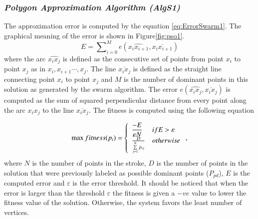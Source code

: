 \documentclass[preprint,10pt,5p,twocolumn]{elsarticle}
\begin{document}
\subsubsection{\textit{Polygon Approximation Algorithm \textsl{(AlgS1)}}}
The approximation error is computed by the equation \ref{eq:ErrorSwarm1}. The graphical meaning of the error is shown in Figure\ref{fig:pso1}.
\begin{equation}
E=\sum\nolimits_{i = 0}^M e ( \widehat{x_ix_{i+1}},\overline{x_i x_{i+1}})
\label{eq:ErrorSwarm1}
\end{equation} where the arc $\widehat{x_ix_j}$ is defined as the consecutive set of points from point $x_i$ to point $x_{j}$ as in $x_i,x_{i+1} \cdots,x_j$. The line $\overline{x_i x_j}$ is defined as the straight line connecting point $x_i$ to point $x_j$ and $M$ is the number of dominant points in this solution as generated by the swarm algorithm. The error $e ( \widehat{x_ix_j},\overline{x_i x_j})$ is computed as the sum of squared perpendicular distance from every point along the arc $\widehat{x_ix_j}$ to the line $\overline{x_i x_j}$. The fitness is computed using the following equation %

\begin{equation}
\max fitness(p_i ) = \left\{ {\begin{array}{*{30}l}
   {\displaystyle \frac{-E}{\varepsilon N}} & {ifE > \varepsilon }  \\ 
   
   { \frac {D}{\sum\limits_{j = 1}^N {p_{ij} } }} & {otherwise}  \\
\end{array}} \right.,
\label{eq:fitnessSwarm1}
\end{equation} where $N$ is the number of points in the stroke, $D$ is the number of points in the solution that were previously labeled as possible dominant points ($P_{pd}$), $E$ is the computed error and $\varepsilon$ is the error threshold. It should be noticed that when the error is larger than the threshold $\varepsilon$ the fitness is given a $-ve$ value to lower the fitness value of the solution. Otherwise, the system favors the least number of vertices.
\end{document}
